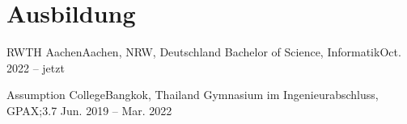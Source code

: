 \section{Ausbildung}
\resumeSubHeadingListStart
\resumeSubheading
{RWTH Aachen}{Aachen, NRW, Deutschland}
{Bachelor of Science, Informatik}{Oct. 2022 -- jetzt}

\resumeSubheading
{Assumption College}{Bangkok, Thailand}
{Gymnasium im Ingenieurabschluss, GPAX;3.7 }{ Jun. 2019 -- Mar. 2022}
\resumeSubHeadingListEnd
